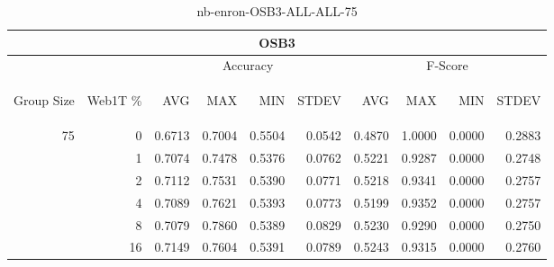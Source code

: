 \begin{center}
\begin{table}[htbp]
\begin{tabular}{ | r | r | r | r | r | r | r | r | r | r |}
\hline
\multicolumn{10}{|c|}{OSB3}\\
\hline
 & & \multicolumn{4}{|c|}{Accuracy} & \multicolumn{4}{|c|}{F-Score}\\ \cline{3-10}
\begin{sideways}Group Size\end{sideways} & \begin{sideways}Web1T \%\end{sideways} & \begin{sideways}AVG\end{sideways} & \begin{sideways}MAX\end{sideways} & \begin{sideways}MIN\end{sideways} & \begin{sideways}STDEV\end{sideways} & \begin{sideways}AVG\end{sideways} & \begin{sideways}MAX\end{sideways} & \begin{sideways}MIN\end{sideways} & \begin{sideways}STDEV\end{sideways}\\
\hline
\multirow{6}{*}{75}
 & 0 & 0.6713 & 0.7004 & 0.5504 & 0.0542 & 0.4870 & 1.0000 & 0.0000 & 0.2883\\ \cline{2-10}
 & 1 & 0.7074 & 0.7478 & 0.5376 & 0.0762 & 0.5221 & 0.9287 & 0.0000 & 0.2748\\ \cline{2-10}
 & 2 & 0.7112 & 0.7531 & 0.5390 & 0.0771 & 0.5218 & 0.9341 & 0.0000 & 0.2757\\ \cline{2-10}
 & 4 & 0.7089 & 0.7621 & 0.5393 & 0.0773 & 0.5199 & 0.9352 & 0.0000 & 0.2757\\ \cline{2-10}
 & 8 & 0.7079 & 0.7860 & 0.5389 & 0.0829 & 0.5230 & 0.9290 & 0.0000 & 0.2750\\ \cline{2-10}
 & 16 & 0.7149 & 0.7604 & 0.5391 & 0.0789 & 0.5243 & 0.9315 & 0.0000 & 0.2760\\ \cline{2-10}
\hline
\end{tabular}
\caption{nb-enron-OSB3-ALL-ALL-75}
\end{table}
\end{center}

